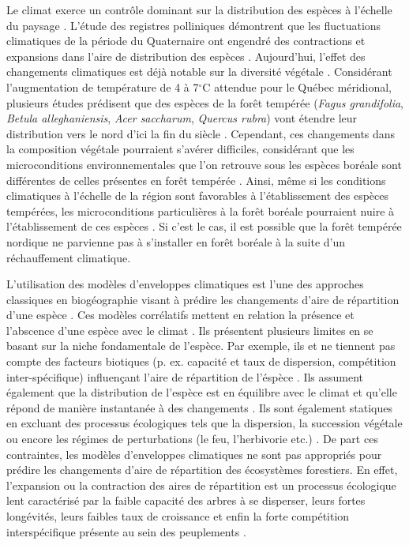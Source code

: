Le climat exerce un contrôle dominant sur la distribution des espèces à l'échelle du paysage
\citep{Pearson2003b}. L'étude des registres polliniques démontrent que les fluctuations climatiques
de la période du Quaternaire ont engendré des contractions et expansions dans l'aire de distribution
des espèces \citep{Davis2001}. Aujourd'hui, l'effet des changements climatiques est déjà notable sur
la diversité végétale \citep{Walther2002a,Parmesan2006}. Considérant l'augmentation de température
de 4 à 7$^\circ$C \citep[Scénario RCP 8.5]{Climatique2015} attendue pour le Québec méridional,
plusieurs études prédisent que des espèces de la forêt tempérée (\textit{Fagus grandifolia},
\textit{Betula alleghaniensis}, \textit{Acer saccharum}, \textit{Quercus rubra}) vont étendre leur
distribution vers le nord d'ici la fin du siècle \citep{Iverson2002,Sciences2014}. Cependant, ces
changements dans la composition végétale pourraient s'avérer difficiles, considérant que les
microconditions environnementales que l’on retrouve sous les espèces boréale sont différentes de
celles présentes en forêt tempérée \citep{Barras1998,Caspersen2005}. Ainsi, même si les conditions
climatiques à l'échelle de la région sont favorables à l'établissement des espèces tempérées, les
microconditions particulières à la forêt boréale pourraient nuire à l'établissement de ces espèces \citep{DeFrenne2013,Lafleur2010}. Si c’est le cas, il est possible que la forêt tempérée
nordique ne parvienne pas à s'installer en forêt boréale à la suite d’un réchauffement climatique.


L'utilisation des modèles d'enveloppes climatiques est l'une des approches classiques en
biogéographie visant à prédire les changements d'aire de répartition d'une espèce
\citep{Pearson2003b}. Ces modèles corrélatifs mettent en relation la présence et l'abscence d'une
espèce avec le climat \citep{Guisan2005a}. Ils présentent plusieurs limites en se basant sur la
niche fondamentale de l'espèce\citep{Guisan2005a}. Par exemple, ils et ne tiennent pas compte des
facteurs biotiques (p. ex. capacité et taux de dispersion, compétition inter-spécifique) influençant
l'aire de répartition de l'éspèce \citep{Guisan2005a,Pearson2003b}. Ils assument également que la
distribution de l'espèce est en équilibre avec le climat et qu'elle répond de manière instantanée à
des changements \citep{Austin2002}. Ils sont également statiques en excluant des processus
écologiques tels que la dispersion, la succession végétale ou encore les régimes de perturbations
(le feu, l'herbivorie etc.) \citep{Austin2002,Guisan2005a}.  De part ces contraintes, les
modèles d'enveloppes climatiques ne sont pas appropriés pour prédire les changements d'aire de
répartition des écosystèmes forestiers. En effet, l'expansion ou la contraction des aires de
répartition est un processus écologique lent caractérisé par la faible capacité des arbres à se
disperser, leurs fortes longévités, leurs faibles taux de croissance et enfin la forte compétition
interspécifique présente au sein des peuplements \citep{Renwick2014,Vanderwel2014}.

